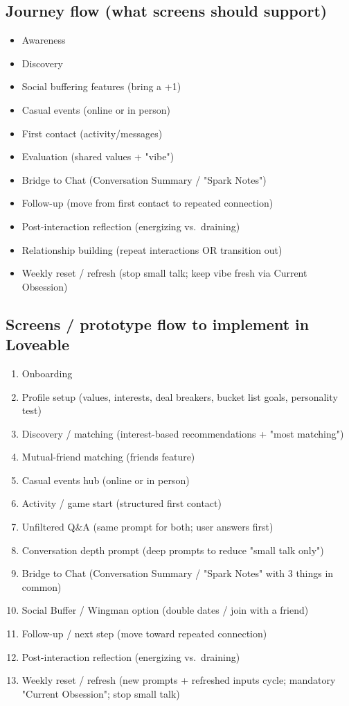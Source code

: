 \documentclass[10pt,a4paper]{article}
\begin{document}
\subsection*{\color{eublue}Journey flow (what screens should support)}
\begin{itemize}
\item Awareness
\item Discovery
\item Social buffering features (bring a +1)
\item Casual events (online or in person)
\item First contact (activity/messages)
\item Evaluation (shared values + "vibe")
\item Bridge to Chat (Conversation Summary / "Spark Notes")
\item Follow-up (move from first contact to repeated connection)
\item Post-interaction reflection (energizing vs.\ draining)
\item Relationship building (repeat interactions OR transition out)
\item Weekly reset / refresh (stop small talk; keep vibe fresh via Current Obsession)
\end{itemize}

\subsection*{\color{eublue}Screens / prototype flow to implement in Loveable}
\begin{enumerate}
\item Onboarding
\item Profile setup (values, interests, deal breakers, bucket list goals, personality test)
\item Discovery / matching (interest-based recommendations + "most matching")
\item Mutual-friend matching (friends feature)
\item Casual events hub (online or in person)
\item Activity / game start (structured first contact)
\item Unfiltered Q\&A (same prompt for both; user answers first)
\item Conversation depth prompt (deep prompts to reduce "small talk only")
\item Bridge to Chat (Conversation Summary / "Spark Notes" with 3 things in common)
\item Social Buffer / Wingman option (double dates / join with a friend)
\item Follow-up / next step (move toward repeated connection)
\item Post-interaction reflection (energizing vs.\ draining)
\item Weekly reset / refresh (new prompts + refreshed inputs cycle; mandatory "Current Obsession"; stop small talk)
\end{enumerate}
\end{document}
